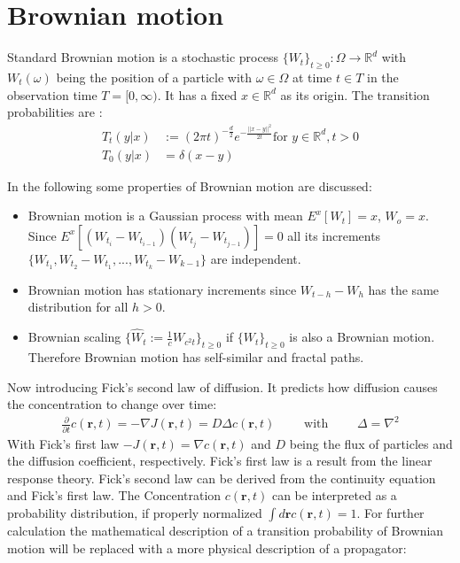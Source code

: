 \documentclass[
  a4paper,BCOR10mm,oneside,
  bibtotoc,idxtotoc,
  headsepline,footsepline,%
  fleqn,openbib
]{scrbook}
\begin{document}
\section{Brownian motion}
\begin{mydef}
Standard Brownian motion is a stochastic process $ \{ W_t \}_{t\geq0}: \Omega \rightarrow \mathbb{R}^d$ with $ W_t(\omega)$ being the position of a particle with $\omega \in \Omega$ at time $t \in T$ in the observation time $T =[0, \infty)$. It has a fixed $x \in \mathbb{R}^d$ as its origin. The transition probabilities are \cite{LectureFelix}: 
\begin{align}
T_{t}(y|x) & := (2 \pi t)^{- \frac{d}{2}} e^{- \frac{||x-y||^2}{2 t}} \text{for } y \in \mathbb{R}^d, t>0 \\ \nonumber
T_{0}(y|x) & = \delta(x-y) 
\end{align}
\end{mydef}
In the following some properties of Brownian motion are discussed:\\
\begin{itemize} \label{bscaling}
\item Brownian motion is a Gaussian process with mean $E^x[W_t]=x$, $W_o=x$.
Since $ E^x[(W_{t_i}-W_{t_{i-1}})(W_{t_j}-W_{t_{j-1}})]=0 $  all its increments $\{W_{t_1},W_{t_2}-W_{t_1},...,W_{t_k}-W_{k-1}\}$ are independent.

\item Brownian motion has stationary increments since ${W_{t-h}-W_{h}}$ has the same distribution for all $h>0$.

\item  Brownian scaling $\{\hat{W}_t := \frac{1}{c} W_{c^2 t} \}_{t\geq0}$ if $\{W_t\}_{t \geq 0}$  is also a Brownian motion. Therefore Brownian motion has self-similar and fractal paths. 
\end{itemize}
Now introducing Fick's second law of diffusion. It predicts how diffusion causes the concentration to change over time:
\begin{align}
 \frac{\partial}{\partial t} c(\bm{r},t) = - \nabla J (\bm{r},t) = D  \Delta c(\bm{r},t) \qquad \text{ with } \qquad \Delta= \nabla^2  \label{eq:ficks}
\end{align}
With Fick's first law $-J(\bm{r},t)=\nabla c(\bm{r},t)$ and $D$ being the flux of particles and the diffusion coefficient, respectively. Fick's first law is a result from the linear response theory. Fick's second law can be derived from the continuity equation and Fick's first law. The Concentration $c(\bm{r},t)$ can be interpreted as a probability distribution, if properly normalized  $\int d\bm{r} c(\bm{r},t)=1$. For further calculation the mathematical description of a transition probability of Brownian motion will be replaced with a more physical description of a propagator:
\end{document}
